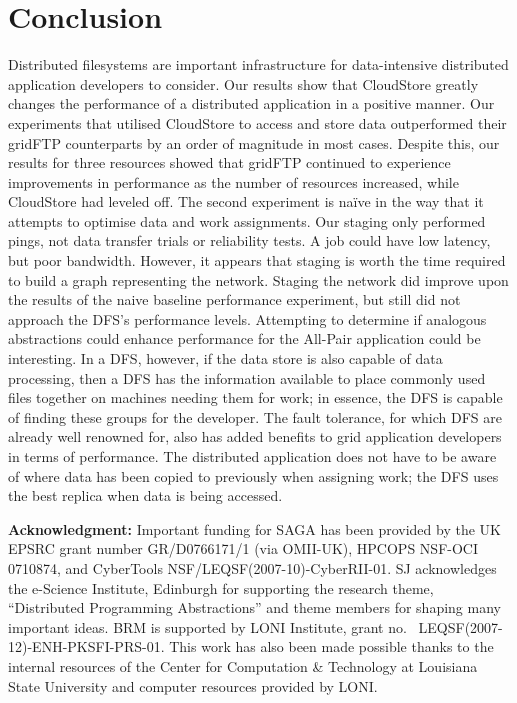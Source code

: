 \documentclass{rspublic}
\begin{document}
\vspace{-0.3cm}

\section{Conclusion} Distributed filesystems are important
infrastructure for data-intensive distributed application developers to
consider. Our results show that CloudStore greatly changes the
performance of a distributed application in a positive manner. Our
experiments that utilised CloudStore to access and store data
outperformed their gridFTP counterparts by an order of magnitude in most
cases. Despite this, our results for three resources showed that gridFTP
continued to experience improvements in performance as the number of
resources increased, while CloudStore had leveled off.  The second
experiment is na\"ive in the way that it attempts to optimise data and
work assignments.  Our staging only performed pings, not data transfer
trials or reliability tests. A job could have low latency, but poor
bandwidth.  However, it appears that staging is worth the time required
to build a graph representing the network. Staging the network did
improve upon the results of the naive baseline performance experiment,
but still did not approach the DFS's performance levels.
Attempting to determine if analogous abstractions could enhance
performance for the All-Pair application could be interesting. In a
DFS, however, if the data store is also capable of data processing,
then a DFS has the information available to place commonly used files
together on machines needing them for work; in essence, the DFS is
capable of finding these groups for the developer. The fault
tolerance, for which DFS are already well renowned for, also has added
benefits to grid application developers in terms of performance.  The
distributed application does not have to be aware of where data has
been copied to previously when assigning work; the DFS uses the best
replica when data is being accessed.

{\bf Acknowledgment:} Important funding for SAGA has been provided by
the UK EPSRC grant number GR/D0766171/1 (via OMII-UK), HPCOPS
NSF-OCI 0710874, and CyberTools NSF/LEQSF(2007-10)-CyberRII-01.
 SJ acknowledges the e-Science Institute, Edinburgh
for supporting the research theme, ``Distributed Programming
Abstractions'' and theme members for shaping many important ideas. BRM
is supported by LONI Institute, grant no. \
LEQSF(2007-12)-ENH-PKSFI-PRS-01. This work has also been made possible
thanks to the internal resources of the Center for Computation \&
Technology at Louisiana State University and computer resources
provided by LONI.

\vspace{-0.3cm}

%
 

\end{document}
